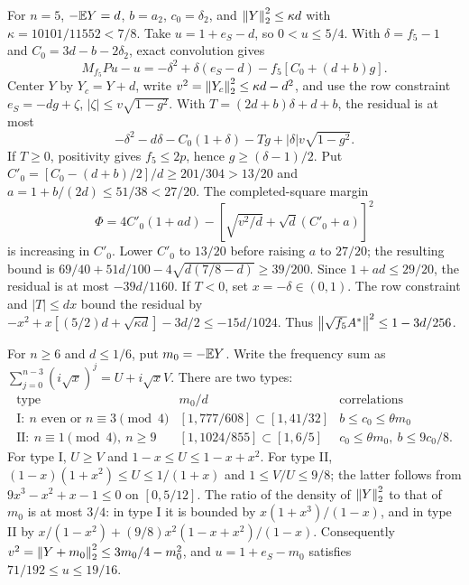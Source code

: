 For $n=5$, $-\mathbb E Y=d$, $b=a_2$, $c_0=\delta_{2}$, and
$\left\lVert Y\right\rVert_2^2\le\kappa d$ with $\kappa=10101/11552<7/8$. Take $u=1+e_S-d$, so $0<u\le5/4$. With $\delta=f_5-1$ and $C_0=3d-b-2\delta_{2}$, exact convolution gives
\[
 M_{f_5}Pu-u=-\delta^2+\delta(e_S-d)-f_5[C_0+(d+b)g].
\]
Center $Y$ by $Y_c=Y+d$, write $v^2=\left\lVert Y_c\right\rVert_2^2\le\kappa d-d^2$, and use the row constraint
$e_S=-dg+\zeta$, $|\zeta|\le v\sqrt{1-g^2}$. With $T=(2d+b)\delta+d+b$, the residual is at most
\[
 -\delta^2-d\delta-C_0(1+\delta)-Tg+
 |\delta|v\sqrt{1-g^2}.
\]
If $T\ge0$, positivity gives $f_5\le2p$, hence $g\ge(\delta-1)/2$. Put
$C'_0=[C_0-(d+b)/2]/d\ge201/304>13/20$ and $a=1+b/(2d)\le51/38<27/20$.
The completed-square margin
\[
 \Phi=4C'_0(1+ad)-
    [\sqrt{v^2/d}+\sqrt d(C'_0+a)]^2
\]
is increasing in $C'_0$. Lower $C'_0$ to $13/20$ before raising $a$ to $27/20$; the resulting bound is
$69/40+51d/100-4\sqrt{d(7/8-d)}\ge39/200$.
Since $1+ad\le29/20$, the residual is at most $-39d/1160$.
If $T<0$, set $x=-\delta\in(0,1)$. The row constraint and $|T|\le dx$ bound the residual by
$-x^2+x[(5/2)d+\sqrt{\kappa d}]-3d/2\le-15d/1024$.
Thus $\left\lVert\sqrt{f_5}A^*\right\rVert^2\le1-3d/256$.

For $n\ge6$ and $d\le1/6$, put $m_0=-\mathbb E Y$. Write the frequency sum as
$\sum_{j=0}^{n-3}(i\sqrt x)^j=U+i\sqrt x V$.
There are two types:
\[
\begin{array}{c|c|c}
\text{type}&m_0/d&\text{correlations}\\\hline
\mathrm I:\ n\text{ even or }n\equiv3\pmod4&
 [1,777/608]\subset[1,41/32]&b\le c_0\le\theta m_0\\
\mathrm {II}:\ n\equiv1\pmod4,\ n\ge9&
 [1,1024/855]\subset[1,6/5]&c_0\le\theta m_0,\ b\le9c_0/8 .
\end{array}
\]
For type I, $U\ge V$ and $1-x\le U\le1-x+x^2$.
For type II, $(1-x)(1+x^2)\le U\le1/(1+x)$ and $1\le V/U\le9/8$; the latter follows from $9x^3-x^2+x-1\le0$ on $[0,5/12]$.
The ratio of the density of $\left\lVert Y\right\rVert_2^2$ to that of $m_0$ is at most $3/4$: in type I it is bounded by $x(1+x^3)/(1-x)$, and in type II by
$x/(1-x^2)+(9/8)x^2(1-x+x^2)/(1-x)$.
Consequently $v^2=\left\lVert Y+m_0\right\rVert_2^2\le3m_0/4-m_0^2$, and $u=1+e_S-m_0$ satisfies $71/192\le u\le19/16$.

